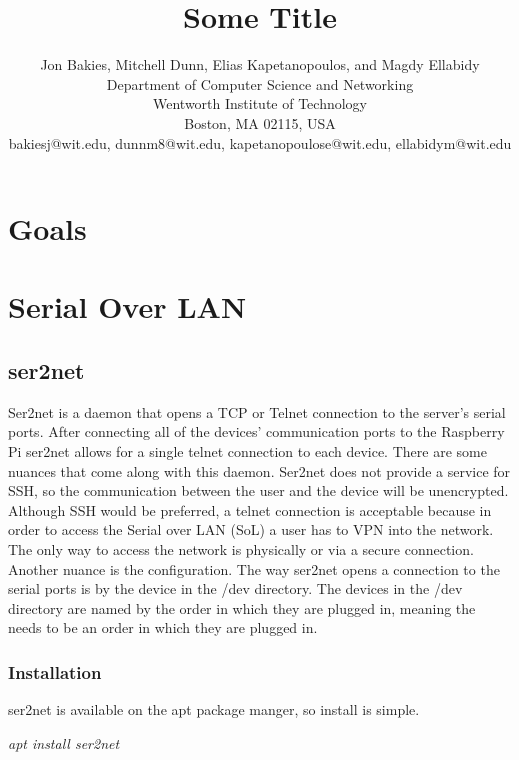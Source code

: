 \documentclass[12pt]{IEEEtran}
\begin{document}
\title{Some Title}
\author{
Jon Bakies, Mitchell Dunn, Elias Kapetanopoulos, and Magdy Ellabidy \\
Department of Computer Science and Networking \\
Wentworth Institute of Technology \\
Boston, MA 02115, USA \\
bakiesj@wit.edu, dunnm8@wit.edu, kapetanopoulose@wit.edu, ellabidym@wit.edu
} 

\maketitle
\newpage
\clearpage

\section{Goals}


\section{Serial Over LAN}
\subsection{ser2net}
Ser2net is a daemon that opens a TCP or Telnet connection to the server's serial ports.
After connecting all of the devices' communication ports to the Raspberry Pi ser2net allows for a single telnet connection to each device.
There are some nuances that come along with this daemon.
Ser2net does not provide a service for SSH, so the communication between the user and the device will be unencrypted.
Although SSH would be preferred, a telnet connection is acceptable because in order to access the Serial over LAN (SoL) a user has to VPN into the network.
The only way to access the network is physically or via a secure connection.
Another nuance is the configuration.
The way ser2net opens a connection to the serial ports is by the device in the /dev directory.
The devices in the /dev directory are named by the order in which they are plugged in, meaning the needs to be an order in which they are plugged in.
\subsubsection{Installation}
ser2net is available on the apt package manger, so install is simple.

\textit{apt install ser2net}
\end{document}
